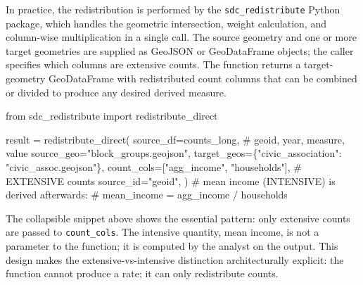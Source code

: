 \documentclass[
  letterpaper,
  DIV=11,
  numbers=noendperiod]{scrreprt}
\newenvironment{Shaded}{\begin{snugshade}}{\end{snugshade}}
\newcommand{\CommentTok}[1]{\textcolor[rgb]{0.37,0.37,0.37}{#1}}
\newcommand{\ImportTok}[1]{\textcolor[rgb]{0.00,0.46,0.62}{#1}}
\newcommand{\NormalTok}[1]{\textcolor[rgb]{0.00,0.23,0.31}{#1}}
\newcommand{\OperatorTok}[1]{\textcolor[rgb]{0.37,0.37,0.37}{#1}}
\newcommand{\StringTok}[1]{\textcolor[rgb]{0.13,0.47,0.30}{#1}}
\begin{document}
In practice, the redistribution is performed by the
\texttt{sdc\_redistribute} Python package, which handles the geometric
intersection, weight calculation, and column-wise multiplication in a
single call. The source geometry and one or more target geometries are
supplied as GeoJSON or GeoDataFrame objects; the caller specifies which
columns are extensive counts. The function returns a target-geometry
GeoDataFrame with redistributed count columns that can be combined or
divided to produce any desired derived measure.

\begin{tcolorbox}[enhanced jigsaw, rightrule=.15mm, leftrule=.75mm, arc=.35mm, title=\textcolor{quarto-callout-note-color}{\faInfo}\hspace{0.5em}{Python: the redistribution call}, opacityback=0, bottomtitle=1mm, opacitybacktitle=0.6, titlerule=0mm, breakable, coltitle=black, toptitle=1mm, colback=white, colframe=quarto-callout-note-color-frame, bottomrule=.15mm, toprule=.15mm, colbacktitle=quarto-callout-note-color!10!white, left=2mm]

\begin{Shaded}
\begin{Highlighting}[]
\ImportTok{from}\NormalTok{ sdc\_redistribute }\ImportTok{import}\NormalTok{ redistribute\_direct}

\NormalTok{result }\OperatorTok{=}\NormalTok{ redistribute\_direct(}
\NormalTok{    source\_df}\OperatorTok{=}\NormalTok{counts\_long,            }\CommentTok{\# geoid, year, measure, value}
\NormalTok{    source\_geo}\OperatorTok{=}\StringTok{"block\_groups.geojson"}\NormalTok{,}
\NormalTok{    target\_geos}\OperatorTok{=}\NormalTok{\{}\StringTok{"civic\_association"}\NormalTok{: }\StringTok{"civic\_assoc.geojson"}\NormalTok{\},}
\NormalTok{    count\_cols}\OperatorTok{=}\NormalTok{[}\StringTok{"agg\_income"}\NormalTok{, }\StringTok{"households"}\NormalTok{],   }\CommentTok{\# EXTENSIVE counts}
\NormalTok{    source\_id}\OperatorTok{=}\StringTok{"geoid"}\NormalTok{,}
\NormalTok{)}
\CommentTok{\# mean income (INTENSIVE) is derived afterwards:}
\CommentTok{\#   mean\_income = agg\_income / households}
\end{Highlighting}
\end{Shaded}

\end{tcolorbox}

The collapsible snippet above shows the essential pattern: only
extensive counts are passed to \texttt{count\_cols}. The intensive
quantity, mean income, is not a parameter to the function; it is
computed by the analyst on the output. This design makes the
extensive-vs-intensive distinction architecturally explicit: the
function cannot produce a rate; it can only redistribute counts.
\end{document}
